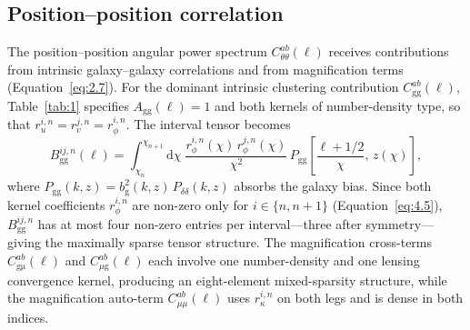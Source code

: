 \subsection{Position--position correlation} \label{sec:5.3}

The position--position angular power spectrum \(C_{\theta\theta}^{ab}(\ell)\) receives contributions from intrinsic galaxy--galaxy correlations and from magnification terms (Equation~\ref{eq:2.7}). For the dominant intrinsic clustering contribution \(C_\mathrm{gg}^{ab}(\ell)\), Table~\ref{tab:1} specifies \(A_\mathrm{gg}(\ell) = 1\) and both kernels of number-density type, so that \(r_u^{i,n} = r_v^{j,n} = r_\phi^{i,n}\). The interval tensor becomes
\begin{equation} \label{eq:5.9}
    B_\mathrm{gg}^{ij,n}(\ell) = \int_{\chi_n}^{\chi_{n+1}} \mathrm{d}\chi\; \frac{r_\phi^{i,n}(\chi)\,r_\phi^{j,n}(\chi)}{\chi^2}\, P_\mathrm{gg}\!\left[\frac{\ell+1/2}{\chi},\, z(\chi)\right],
\end{equation}
where \(P_\mathrm{gg}(k,z) = b_\mathrm{g}^2(k,z)\,P_{\delta\delta}(k,z)\) absorbs the galaxy bias. Since both kernel coefficients \(r_\phi^{i,n}\) are non-zero only for \(i \in \{n, n{+}1\}\) (Equation~\ref{eq:4.5}), \(B_\mathrm{gg}^{ij,n}\) has at most four non-zero entries per interval---three after symmetry---giving the maximally sparse tensor structure. The magnification cross-terms \(C_\mathrm{g\mu}^{ab}(\ell)\) and \(C_{\mu\mathrm{g}}^{ab}(\ell)\) each involve one number-density and one lensing convergence kernel, producing an eight-element mixed-sparsity structure, while the magnification auto-term \(C_{\mu\mu}^{ab}(\ell)\) uses \(r_\kappa^{i,n}\) on both legs and is dense in both indices.

